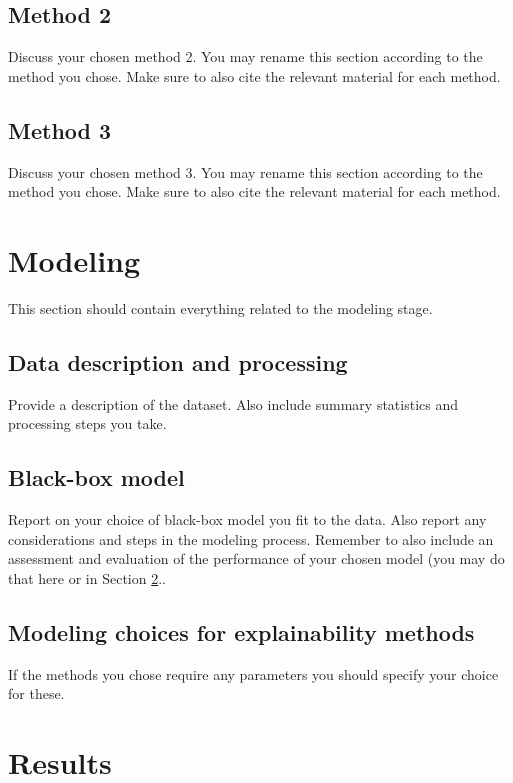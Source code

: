 \documentclass[twocolumn]{article}
\begin{document}
\subsection{Method 2}

Discuss your chosen method 2. You may rename this section according to the method you chose. Make sure to also cite the relevant material for each method. 

\subsection{Method 3}

Discuss your chosen method 3. You may rename this section according to the method you chose. Make sure to also cite the relevant material for each method. 


\section{Modeling}

This section should contain everything related to the modeling stage.

\subsection{Data description and processing}

Provide a description of the dataset. Also include summary statistics and processing steps you take.

\subsection{Black-box model}

Report on your choice of black-box model you fit to the data. Also report any considerations and steps in the modeling process. Remember to also include an assessment and evaluation of the performance of your chosen model (you may do that here or in Section \ref{sec:results}..

\subsection{Modeling choices for explainability methods}

If the methods you chose require any parameters you should specify your choice for these. 

\section{Results}\label{sec:results}
\end{document}
